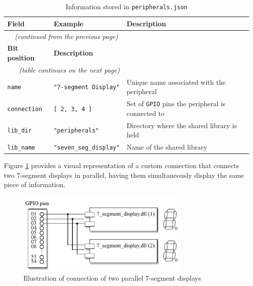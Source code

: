 \documentclass[english, ing, kiv, he, iso690numb, pdf]{fasthesis}
\begin{document}
	\begin{center}
		\begin{longtable}{p{}p{}p{}}
			\caption{Information stored in \texttt{peripherals.json}}
			\label{Information stored in peripherals.json}\\
			\toprule[1.5pt]
			\textbf{Field} & \textbf{Example} & \textbf{Description}\\
			\midrule
			\endfirsthead
			\multicolumn{2}{c}{\tablename{}~\thetable{} \textit{(continued from the previous page)}}\\
			\midrule
			\textbf{Bit position} & \textbf{Description}\\
			\midrule
			\endhead
			\midrule
			\multicolumn{2}{r}{\textit{(table continues on the next page)}}\\
			\endfoot
			\bottomrule[1.5pt]
			\endlastfoot
			\texttt{name} & \texttt{"7-segment Display"} & Unique name associated with the peripheral\\ 
			\texttt{connection} & \texttt{[ 2, 3, 4 ]} & Set of \texttt{GPIO} pins the peripheral is connected to\\ 
			\texttt{lib\_dir} & \texttt{"peripherals"} & Directory where the shared library is held\\
			\texttt{lib\_name} & \texttt{"seven\_seg\_display"} & Name of the shared library\\
		\end{longtable}
	\end{center}
	
	\newpage
	
	Figure \ref{Illustration of connection of two parallel 7-segment displays} provides a visual representation of a custom connection that connects two 7-segment displays in parallel, having them simultaneously display the same piece of information.
	
	\begin{figure}[ht]
		\centering
		\includegraphics[width=0.75\textwidth]{img/diagrams/connection.pdf}
		\caption{Illustration of connection of two parallel 7-segment displays}
		\label{Illustration of connection of two parallel 7-segment displays}
	\end{figure}
	
\end{document}
